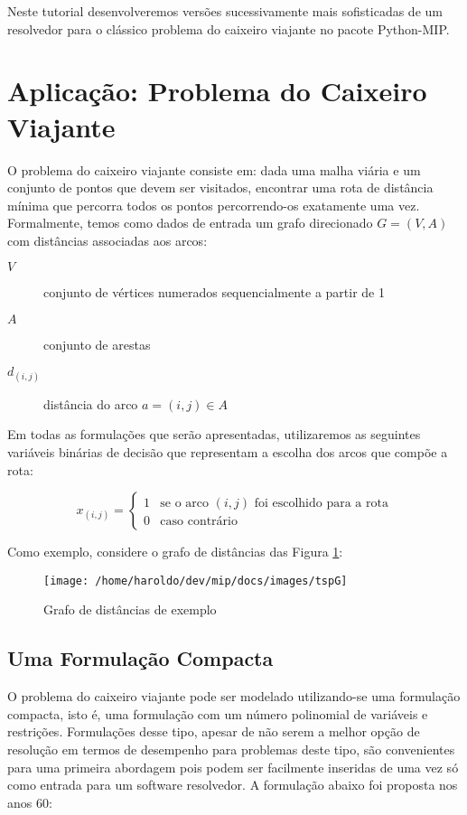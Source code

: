 \documentclass[a4paper,11pt,fleqn]{article}
\begin{document}
Neste tutorial desenvolveremos versões sucessivamente mais sofisticadas
de um resolvedor para o clássico problema do caixeiro viajante no
pacote Python-MIP.

\section{Aplicação: Problema do Caixeiro Viajante}

O problema do caixeiro viajante consiste em: dada uma malha viária
e um conjunto de pontos que devem ser visitados, encontrar uma rota
de distância mínima que percorra todos os pontos percorrendo-os exatamente
uma vez. Formalmente, temos como dados de entrada um grafo direcionado
$G=(V,A)$ com distâncias associadas aos arcos:
\begin{description}
\item [{$V$}] conjunto de vértices numerados sequencialmente a partir
de 1
\item [{$A$}] conjunto de arestas
\item [{$d_{(i,j)}$}] distância do arco $a=(i,j)\in A$
\end{description}
Em todas as formulações que serão apresentadas, utilizaremos as seguintes
variáveis binárias de decisão que representam a escolha dos arcos
que compõe a rota:

\[
x_{(i,j)}=\begin{cases}
1 & \textrm{se o arco }(i,j)\textrm{ foi escolhido para a rota}\\
0 & \textrm{caso contrário}
\end{cases}
\]

Como exemplo, considere o grafo de distâncias das Figura \ref{figG}:

\begin{figure}
\begin{centering}
\texttt{[image: /home/haroldo/dev/mip/docs/images/tspG]}
\par\end{centering}
\caption{Grafo de distâncias de exemplo}

\label{figG}
\end{figure}


\subsection{Uma Formulação Compacta}

O problema do caixeiro viajante pode ser modelado utilizando-se uma
formulação compacta, isto é, uma formulação com um número polinomial
de variáveis e restrições. Formulações desse tipo, apesar de não serem
a melhor opção de resolução em termos de desempenho para problemas
deste tipo, são convenientes para uma primeira abordagem pois podem
ser facilmente inseridas de uma vez só como entrada para um software
resolvedor. A formulação abaixo foi proposta\cite{Miller1960} nos
anos 60:
\end{document}
